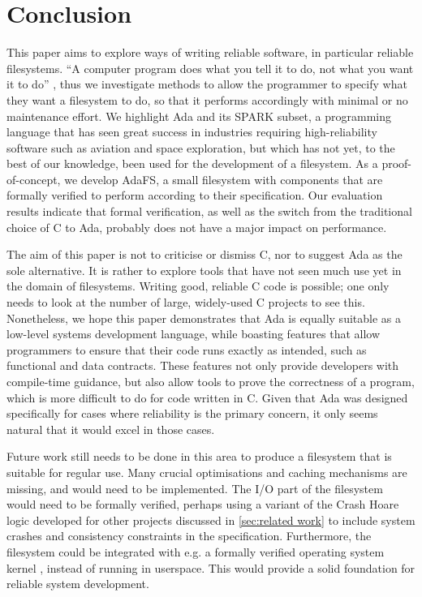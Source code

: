 \section{Conclusion}
This paper aims to explore ways of writing reliable software, in particular reliable filesystems.
``A computer program does what you tell it to do, not what you want it to do'' \cite{bloch1997}, thus we investigate methods to allow the programmer to specify what they want a filesystem to do, so that it performs accordingly with minimal or no maintenance effort.
We highlight Ada and its SPARK subset, a programming language that has seen great success in industries requiring high-reliability software such as aviation and space exploration, but which has not yet, to the best of our knowledge, been used for the development of a filesystem.
As a proof-of-concept, we develop AdaFS, a small filesystem with components that are formally verified to perform according to their specification.
Our evaluation results indicate that formal verification, as well as the switch from the traditional choice of C to Ada, probably does not have a major impact on performance.

The aim of this paper is not to criticise or dismiss C, nor to suggest Ada as the sole alternative.
It is rather to explore tools that have not seen much use yet in the domain of filesystems.
Writing good, reliable C code is possible; one only needs to look at the number of large, widely-used C projects to see this.
Nonetheless, we hope this paper demonstrates that Ada is equally suitable as a low-level systems development language, while boasting features that allow programmers to ensure that their code runs exactly as intended, such as functional and data contracts.
These features not only provide developers with compile-time guidance, but also allow tools to prove the correctness of a program, which is more difficult to do for code written in C.
Given that Ada was designed specifically for cases where reliability is the primary concern, it only seems natural that it would excel in those cases.

Future work still needs to be done in this area to produce a filesystem that is suitable for regular use.
Many crucial optimisations and caching mechanisms are missing, and would need to be implemented.
The I/O part of the filesystem would need to be formally verified, perhaps using a variant of the Crash Hoare logic developed for other projects discussed in \autoref{sec:related work} to include system crashes and consistency constraints in the specification.
Furthermore, the filesystem could be integrated with e.g. a formally verified operating system kernel \cite{king2019}, instead of running in userspace.
This would provide a solid foundation for reliable system development.
